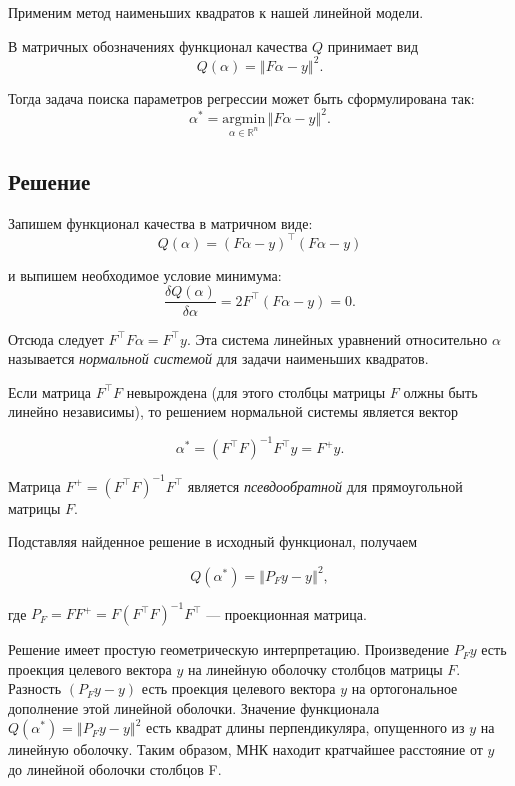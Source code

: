 \documentclass[11pt,a4paper]{article}
\begin{document}
Применим метод наименьших квадратов к нашей линейной модели.

В матричных обозначениях функционал качества \(Q\) принимает вид
\[ Q(\alpha) = \left\Vert F\alpha - y \right\Vert^2. \]

Тогда задача поиска параметров регрессии может быть сформулирована так:
\[ \alpha^* = \underset{\alpha \in \mathbb{R}^n}{\text{argmin}} \, {\left\Vert F\alpha - y \right\Vert^2}. \]

    \hypertarget{ux440ux435ux448ux435ux43dux438ux435}{%
\subsection{Решение}\label{ux440ux435ux448ux435ux43dux438ux435}}

Запишем функционал качества в матричном виде:
\[ Q(\alpha) = (F\alpha - y)^\top (F\alpha - y) \]

и выпишем необходимое условие минимума:
\[ \frac{\delta Q(\alpha)}{\delta \alpha} = 2F^\top (F\alpha - y) = 0. \]

Отсюда следует \(F^{\top} F \alpha = F^{\top}y\). Эта система линейных
уравнений относительно \(\alpha\) называется \emph{нормальной системой}
для задачи наименьших квадратов.

Если матрица \(F^{\top} F\) невырождена (для этого столбцы матрицы \(F\)
олжны быть линейно независимы), то решением нормальной системы является
вектор

\[ \alpha^* = (F^{\top} F)^{-1} F^{\top} y = F^{+} y. \]

Матрица \(F^{+} = (F^{\top} F)^{-1} F^{\top}\) является
\emph{псевдообратной} для прямоугольной матрицы \(F\).

Подставляя найденное решение в исходный функционал, получаем

\[ Q(\alpha^*) = \left\Vert P_Fy - y \right\Vert^2, \]

где \(P_F = FF^{+} = F(F^{\top}F)^{-1}F^{\top}\) --- проекционная
матрица.

Решение имеет простую геометрическую интерпретацию. Произведение
\(P_Fy\) есть проекция целевого вектора \(y\) на линейную оболочку
столбцов матрицы \(F\). Разность \((P_Fy-y)\) есть проекция целевого
вектора \(y\) на ортогональное дополнение этой линейной оболочки.
Значение функционала \(Q(\alpha^*) = \left\Vert P_Fy - y \right\Vert^2\)
есть квадрат длины перпендикуляра, опущенного из \(y\) на линейную
оболочку. Таким образом, МНК находит кратчайшее расстояние от \(y\) до
линейной оболочки столбцов F.
\end{document}
